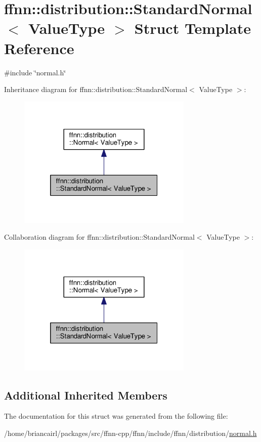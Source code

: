 \hypertarget{structffnn_1_1distribution_1_1_standard_normal}{\section{ffnn\-:\-:distribution\-:\-:Standard\-Normal$<$ Value\-Type $>$ Struct Template Reference}
\label{structffnn_1_1distribution_1_1_standard_normal}
}


{\ttfamily \#include \char`\"{}normal.\-h\char`\"{}}



Inheritance diagram for ffnn\-:\-:distribution\-:\-:Standard\-Normal$<$ Value\-Type $>$\-:
\nopagebreak
\begin{figure}[H]
\begin{center}
\leavevmode
\includegraphics[width=236pt]{structffnn_1_1distribution_1_1_standard_normal__inherit__graph}
\end{center}
\end{figure}


Collaboration diagram for ffnn\-:\-:distribution\-:\-:Standard\-Normal$<$ Value\-Type $>$\-:
\nopagebreak
\begin{figure}[H]
\begin{center}
\leavevmode
\includegraphics[width=236pt]{structffnn_1_1distribution_1_1_standard_normal__coll__graph}
\end{center}
\end{figure}
\subsection*{Additional Inherited Members}


The documentation for this struct was generated from the following file\-:\begin{DoxyCompactItemize}
\item 
/home/briancairl/packages/src/ffnn-\/cpp/ffnn/include/ffnn/distribution/\hyperlink{normal_8h}{normal.\-h}\end{DoxyCompactItemize}
